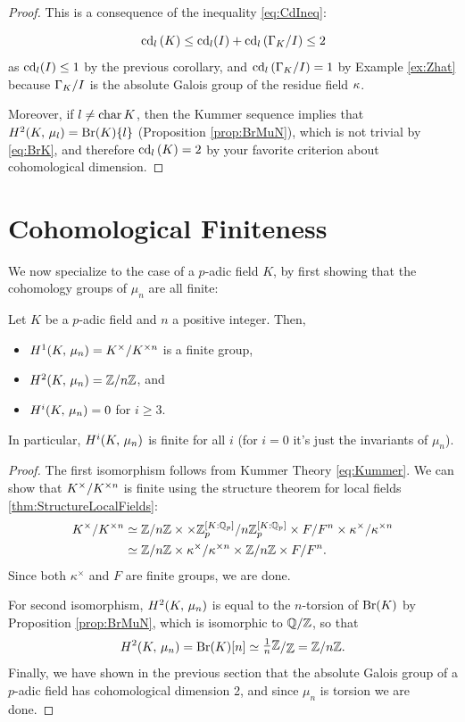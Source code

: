\documentclass[a4paper, oneside]{memoir}
\begin{document}
\begin{proof}
    This is a consequence of the inequality \ref{eq:CdIneq}:

    \[
        \operatorname{cd}_l{(K)}\leq \operatorname{cd}_l(I)+\operatorname{cd}_l{(\Gamma_K / I)} \leq 2
    \]
    as $\operatorname{cd}_l(I)\leq 1$ by the previous corollary, and $\operatorname{cd}_l{(\Gamma_K / I)} = 1$ by Example \ref{ex:Zhat} because $\Gamma_K / I$ is the absolute Galois group of the residue
    field $\kappa$.

    Moreover, if $l\neq \operatorname{char}{K}$, then the Kummer sequence implies that $H^{2}( K, \, \mu_l )=\mathrm{Br}(K)\{l\}$ (Proposition \ref{prop:BrMuN}), which is not trivial by \eqref{eq:BrK}, and
    therefore $\operatorname{cd}_l{(K)}=2$ by your favorite criterion about cohomological dimension.
\end{proof}

\section{Cohomological Finiteness}

We now specialize to the case of a $p$-adic field $K$, by first showing that the cohomology groups of $\mu_n$ are all finite:

\begin{theorem}\label{thm:CohomMuN}
    Let $K$ be a $p$-adic field and $n$ a positive integer.
    Then,
    \begin{itemize}
        \item $H^{1}( K, \, \mu_n ) = K^\times/K^{\times n}$ is a finite group,
        \item $H^{2}( K, \, \mu_n ) = \mathbb{Z}/n\mathbb{Z}$, and
        \item $H^{i}( K, \, \mu_n ) = 0$ for $i\geq 3$.
    \end{itemize}
    In particular, $H^{i}( K, \, \mu_n )$ is finite for all $i$ (for $i=0$ it's just the invariants of $\mu_n$).
\end{theorem}
\begin{proof}
    The first isomorphism follows from Kummer Theory \eqref{eq:Kummer}. We can show that $K^\times/K^{\times n}$ is finite using the structure theorem for local fields \ref{thm:StructureLocalFields}:
    \begin{align*}
        K^\times/K^{\times n} & \simeq \mathbb{Z}/n\mathbb{Z} \times  \times \mathbb{Z}_p^{[K:\mathbb{Q}_p]}/n \mathbb{Z}_p^{[K:\mathbb{Q}_p]} \times F/F^n \times  \kappa^\times/\kappa^{\times n} \\
                                & \simeq \mathbb{Z}/n\mathbb{Z} \times \kappa^\times/\kappa^{\times n} \times  \mathbb{Z}/n\mathbb{Z} \times F/F^n.
    \end{align*}
    Since both $\kappa^\times$ and $F$ are finite groups, we are done.

    For second isomorphism, $H^{2}( K, \, \mu_n )$ is equal to the $n$-torsion of $\mathrm{Br}(K)$ by Proposition \ref{prop:BrMuN}, which is isomorphic to $\mathbb{Q}/\mathbb{Z}$, so that
    \[
        \H{2}{\K}{\mu_n} = \Br{\K}[n] \simeq \ssfrac{\frac{1}{n}\Z}{\Z} = \Z/n\Z.
    \]
    Finally, we have shown in the previous section that the absolute Galois group of a $p$-adic field has cohomological dimension 2, and since $\mu_n$ is torsion we are done.
\end{proof}
\end{document}
